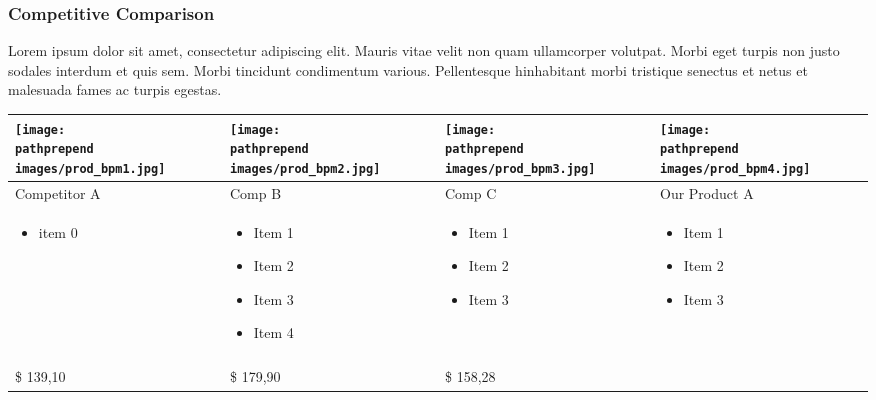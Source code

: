 \documentclass[11pt]{article}
\def\pathprepend{}%
\def\pathprepend{business_plan/}%
\begin{document}
\subsubsection{Competitive Comparison}
Lorem ipsum dolor sit amet, consectetur adipiscing elit. Mauris vitae velit
non quam ullamcorper volutpat. Morbi eget turpis non justo sodales interdum
et quis sem. Morbi tincidunt condimentum various. Pellentesque hinhabitant morbi
tristique senectus et netus et malesuada fames ac turpis egestas.\newline
\begin{tabular}{| m{92 pt} | m{92 pt} | m{92 pt} | m{92 pt} |}\hline
	\texttt{[image: \\pathprepend images/prod\_bpm1.jpg]} &
		\texttt{[image: \\pathprepend images/prod\_bpm2.jpg]} &
		\texttt{[image: \\pathprepend images/prod\_bpm3.jpg]} &
		\texttt{[image: \\pathprepend images/prod\_bpm4.jpg]} \\ \hline
	Competitor A & Comp B & Comp C & Our Product A\\ \hline
	\begin{itemize} \tiny \item  item 0 \end{itemize} &
					\begin{itemize} \tiny
							\item Item 1
							\item Item 2
							\item Item 3
							\item Item 4\end{itemize} &
					\begin{itemize} \tiny
							\item Item 1
							\item Item 2
							\item Item 3\end{itemize}&
					\begin{itemize} \tiny
							\item Item 1
							\item Item 2
							\item Item 3 \end{itemize} \\
	& & & \\ \hline
	\$ 139,10 & \$ 179,90 & \$ 158,28 & \\ \hline
\end{tabular}
\end{document}
